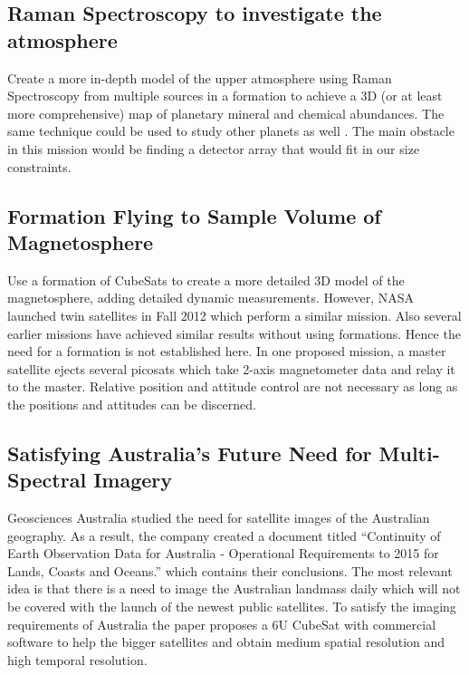 \subsection{Raman Spectroscopy to investigate the atmosphere}
\label{raman}
Create a more in-depth model of the upper atmosphere using Raman Spectroscopy from multiple sources in a formation to achieve a 3D (or at least more comprehensive) map of planetary mineral and chemical abundances. The same technique could be used to study other planets as well \cite{Ref:Cantrell}. The main obstacle in this mission would be finding a detector array that would fit in our size constraints. 

\subsection{Formation Flying to Sample Volume of Magnetosphere}
\label{vol_magnetosphere}
Use a formation of CubeSats to create a more detailed 3D model of the magnetosphere, adding detailed dynamic measurements. However, NASA launched twin satellites in Fall 2012 which perform a similar mission. Also several earlier missions have achieved similar results without using formations\cite{Ref:Mag3D}. Hence the need for a formation is not established here. In one proposed mission, a master satellite ejects several picosats which take 2-axis magnetometer data and relay it to the master. Relative position and attitude control are not necessary as long as the positions and attitudes can be discerned.\cite{Ref:Clarke}

\subsection{Satisfying Australia's Future Need for Multi-Spectral Imagery}
\label{australia_imagery}

Geosciences Australia studied the need for satellite images of the Australian geography. As a result, the company created a document titled ``Continuity of Earth Observation Data for Australia - Operational Requirements to 2015 for Lands, Coasts and Oceans.'' which contains their conclusions. The most relevant idea is that there is a need to image the Australian landmass daily which will not be covered with the launch of the newest public satellites. To satisfy the imaging requirements of Australia the paper proposes a 6U CubeSat with commercial software to help the bigger satellites and obtain medium spatial resolution and high temporal resolution. \cite{Stepan_ConstellationImagery}

